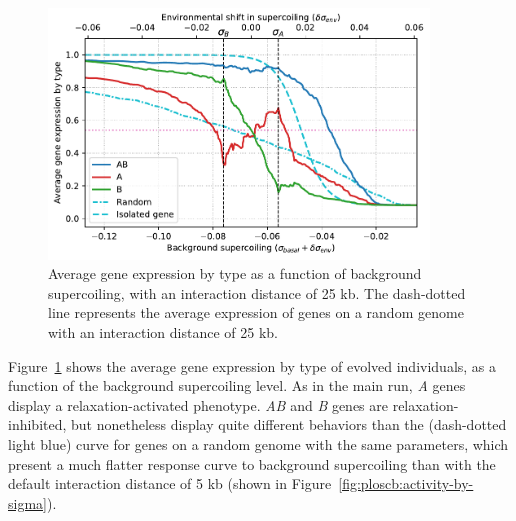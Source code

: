 \begin{figure}[H]
\centering
\includegraphics[width=0.9\textwidth]{param/interaction-25k/activity_sigmas_avg.pdf}
\caption[Average gene expression as a function of background supercoiling, with an interaction distance of 25 kb]{Average gene expression by type as a function of background supercoiling, with an interaction distance of 25 kb.
The dash-dotted line represents the average expression of genes on a random genome with an interaction distance of 25 kb.}
\label{fig:param:inter25k-activ-by-sigma}
\end{figure}

Figure~\ref{fig:param:inter25k-activ-by-sigma} shows the average gene expression by type of evolved individuals, as a function of the background supercoiling level.
As in the main run, \emph{A} genes display a relaxation-activated phenotype.
\emph{AB} and \emph{B} genes are relaxation-inhibited, but nonetheless display quite different behaviors than the (dash-dotted light blue) curve for genes on a random genome with the same parameters, which present a much flatter response curve to background supercoiling than with the default interaction distance of 5 kb (shown in Figure~\ref{fig:ploscb:activity-by-sigma}).

